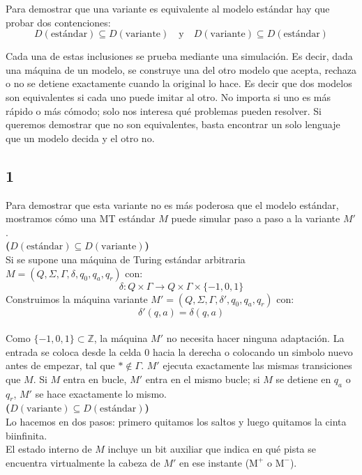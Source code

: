 Para demostrar que una variante es equivalente al modelo estándar hay que probar dos contenciones:
\[
D(\text{estándar}) \subseteq D(\text{variante}) \quad \text{y} \quad D(\text{variante}) \subseteq D(\text{estándar})
\]

Cada una de estas inclusiones se prueba mediante una simulación. Es decir, dada una máquina de un modelo, se construye una del otro modelo que acepta, rechaza o no se detiene exactamente cuando la original lo hace. Es decir que dos modelos son equivalentes si cada uno puede imitar al otro. No importa si uno es más rápido o más cómodo; solo nos interesa qué problemas pueden resolver. Si queremos demostrar que no son equivalentes, basta encontrar un solo lenguaje que un modelo decida y el otro no.


\subsection*{1} Para demostrar que esta variante no es más poderosa que el modelo estándar, mostramos cómo una MT estándar $M$ puede simular paso a paso a la variante $M'$.\\

 \textbf{($D(\text{estándar}) \subseteq D(\text{variante})$)}\\
 
 Si se supone una máquina de Turing estándar arbitraria $M = (Q, \Sigma, \Gamma, \delta, q_0, q_{a}, q_{r})$ con:$$\delta : Q \times \Gamma \rightarrow Q \times \Gamma \times \{-1, 0, 1\}$$Construimos la máquina variante $M' = (Q, \Sigma, \Gamma, \delta', q_0, q_{a}, q_{r})$ con:$$\delta'(q, a) = \delta(q, a)$$\\
 
 Como $\{-1, 0, 1\} \subset \mathbb{Z}$, la máquina $M'$ no necesita hacer ninguna adaptación. La entrada se coloca desde la celda $0$ hacia la derecha o colocando un simbolo nuevo antes de empezar, tal que $* \notin \Gamma$. $M'$ ejecuta exactamente las mismas transiciones que $M$. Si $M$ entra en bucle, $M'$ entra en el mismo bucle; si $M$ se detiene en $q_{a}$ o $q_{r}$, $M'$ se hace exactamente lo mismo.\\

\textbf{($D(\text{variante}) \subseteq D(\text{estándar})$)}\\

Lo hacemos en dos pasos: primero quitamos los saltos y luego quitamos la cinta biinfinita.\\

El estado interno de $M$ incluye un bit auxiliar que indica en qué pista se encuentra virtualmente la cabeza de $M'$ en ese instante ($\text{M}^+$ o $\text{M}^-$).\\

